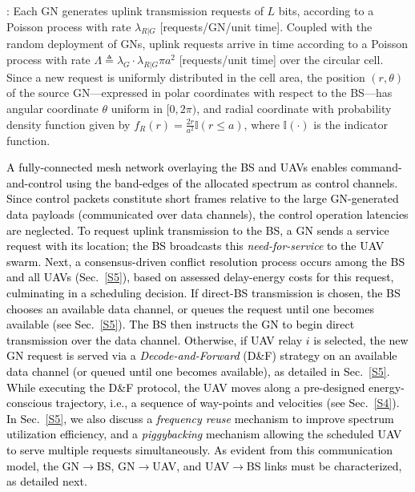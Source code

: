 \documentclass[10pt, twocolumn]{IEEEtran}
\theoremstyle{plain}
\theoremstyle{definition}
\theoremstyle{remark}
\newcommand\hlt[1]{\textcolor{black}{#1}}
\begin{document}
\label{comm_model_label}
: Each GN generates uplink transmission requests of $L$ bits, according to a Poisson process with rate $\lambda_{R{|}G}$ [requests/GN/unit time]. Coupled with the random deployment of GNs, uplink requests arrive in time according to a Poisson process with rate $\Lambda{\triangleq}\lambda_{G}{\cdot}\lambda_{R{|}G}\pi a^{2}$ [requests/unit time] over the circular cell. Since a new request is uniformly distributed in the cell area, the position $(r,\theta)$ of the source GN---expressed in polar coordinates with respect to the BS---has angular coordinate $\theta$ uniform in $[0,2\pi)$, and radial coordinate with probability density function given by $f_{R}(r){=}\frac{2r}{a^2}\mathbb{I}(r{\leq}a)$, where $\mathbb{I}(\cdot)$ is the indicator function. 

\hlt{A fully-connected mesh network overlaying the BS and UAVs enables command-and-control using the band-edges of the allocated spectrum as control channels. Since control packets constitute short frames relative to the large GN-generated data payloads (communicated over data channels), the control operation latencies are neglected. To request uplink transmission to the BS, a GN sends a service request with its location; the BS broadcasts this \emph{need-for-service} to the UAV swarm. Next, a consensus-driven conflict resolution process occurs among the BS and all UAVs (Sec.~\ref{S5}), based on assessed delay-energy costs for this request, culminating in a scheduling decision. If direct-BS transmission is chosen, the BS chooses an available data channel, or queues the request until one becomes available (see Sec.~\ref{S5}). The BS then instructs the GN to begin direct transmission over the data channel. Otherwise, if UAV relay $i$ is selected, the new GN request is served via a \emph{Decode-and-Forward} (D\&F) strategy on an available data channel (or queued until one becomes available), as detailed in Sec.~\ref{S5}. While executing the D\&F protocol, the UAV moves along a pre-designed energy-conscious trajectory, i.e., a sequence of way-points and velocities (see Sec.~\ref{S4}). In Sec.~\ref{S5}, we also discuss a \emph{frequency reuse} mechanism to improve spectrum utilization efficiency, and a \emph{piggybacking} mechanism allowing the scheduled UAV to serve multiple requests simultaneously. As evident from this communication model, the GN$\rightarrow$BS, GN$\rightarrow$UAV, and UAV$\rightarrow$BS links must be characterized, as detailed next.}
\end{document}
